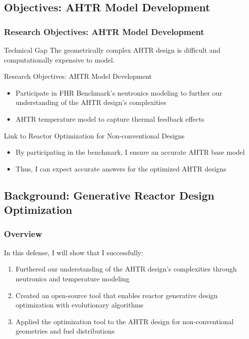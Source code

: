 \subsection{Objectives: AHTR Model Development}
    \begin{frame}
        \frametitle{Research Objectives: AHTR Model Development}
        \begin{block}{Technical Gap}
            The geometrically complex AHTR design is difficult and computationally 
            expensive to model. 
        \end{block}
        \begin{block}{Research Objectives: AHTR Model Development}
        \begin{itemize}
            \item Participate in FHR Benchmark's neutronics modeling to further our 
            understanding of the AHTR design's complexities
            \item AHTR temperature model to capture thermal feedback effects
        \end{itemize}
        \end{block}
        \begin{block}{Link to Reactor Optimization for Non-conventional Designs}
        \begin{itemize}
        \item By participating in the benchmark, I ensure an accurate AHTR base model
        \item Thus, I can expect accurate answers for the optimized AHTR designs
        \end{itemize}
        \end{block}
    \end{frame}

\subsection{Background: Generative Reactor Design Optimization}
\begin{frame}
    \frametitle{Overview}
    In this defense, I will show that I successfully: 
    \begin{enumerate}
        \item Furthered our understanding of the \gls{AHTR} design's complexities 
        through neutronics and temperature modeling
        \item Created an open-source tool that enables reactor generative 
        design optimization with evolutionary algorithms
        \item Applied the optimization tool to the \gls{AHTR} design for 
        non-conventional geometries and fuel distributions 
    \end{enumerate}
\end{frame}

